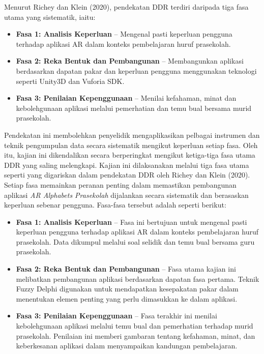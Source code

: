 Menurut Richey dan Klein (2020), pendekatan DDR terdiri daripada tiga fasa utama yang sistematik, iaitu:
\begin{itemize}
  \item \textbf{Fasa 1: Analisis Keperluan} – Mengenal pasti keperluan pengguna terhadap aplikasi AR dalam konteks pembelajaran huruf prasekolah.
  \item \textbf{Fasa 2: Reka Bentuk dan Pembangunan} – Membangunkan aplikasi berdasarkan dapatan pakar dan keperluan pengguna menggunakan teknologi seperti Unity3D dan Vuforia SDK.
  \item \textbf{Fasa 3: Penilaian Kepenggunaan} – Menilai kefahaman, minat dan kebolehgunaan aplikasi melalui pemerhatian dan temu bual bersama murid prasekolah.
\end{itemize}

Pendekatan ini membolehkan penyelidik mengaplikasikan pelbagai instrumen dan teknik pengumpulan data secara sistematik mengikut keperluan setiap fasa. Oleh itu, kajian ini dikendalikan secara berperingkat mengikut ketiga-tiga fasa utama DDR yang saling melengkapi.
Kajian ini dilaksanakan melalui tiga fasa utama seperti yang digariskan dalam pendekatan DDR oleh Richey dan Klein (2020). Setiap fasa memainkan peranan penting dalam memastikan pembangunan aplikasi \textit{AR Alphabets Prasekolah} dijalankan secara sistematik dan berasaskan keperluan sebenar pengguna. Fasa-fasa tersebut adalah seperti berikut:

\begin{itemize}
  \item \textbf{Fasa 1: Analisis Keperluan} – Fasa ini bertujuan untuk mengenal pasti keperluan pengguna terhadap aplikasi AR dalam konteks pembelajaran huruf prasekolah. Data dikumpul melalui soal selidik dan temu bual bersama guru prasekolah.
  
  \item \textbf{Fasa 2: Reka Bentuk dan Pembangunan} – Fasa utama kajian ini melibatkan pembangunan aplikasi berdasarkan dapatan fasa pertama. Teknik Fuzzy Delphi digunakan untuk mendapatkan kesepakatan pakar dalam menentukan elemen penting yang perlu dimasukkan ke dalam aplikasi.
  
  \item \textbf{Fasa 3: Penilaian Kepenggunaan} – Fasa terakhir ini menilai kebolehgunaan aplikasi melalui temu bual dan pemerhatian terhadap murid prasekolah. Penilaian ini memberi gambaran tentang kefahaman, minat, dan keberkesanan aplikasi dalam menyampaikan kandungan pembelajaran.
\end{itemize}

